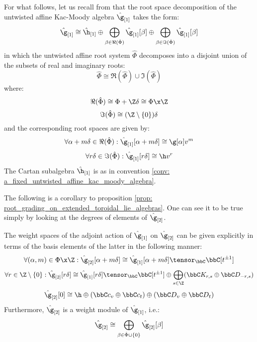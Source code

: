         \begin{remark}
            For what follows, let us recall from \cite[Chapter 7]{kac_infinite_dimensional_lie_algebras} that the root space decomposition of the untwisted affine Kac-Moody algebra $\hat{\g}_{[1]}$ takes the form:
                $$\hat{\g}_{[1]} \cong \hat{\h}_{[1]} \oplus \bigoplus_{\beta \in \Re(\hat{\Phi})} \hat{\g}_{[1]}[\beta] \oplus \bigoplus_{\beta \in \Im(\hat{\Phi})} \hat{\g}_{[1]}[\beta]$$
            in which the untwisted affine root system $\hat{\Phi}$ decomposes into a disjoint union of the subsets of real and imaginary roots:
                $$\hat{\Phi} \cong \Re(\hat{\Phi}) \cup \Im(\hat{\Phi})$$
            where:
                $$\Re(\hat{\Phi}) \cong \Phi + \Z\delta \cong \Phi \x \Z$$
                $$\Im(\hat{\Phi}) \cong (\Z \setminus \{0\})\delta$$
            and the corresponding root spaces are given by:
                $$\forall \alpha + m\delta \in \Re(\hat{\Phi}): \hat{\g}_{[1]}[\alpha + m\delta] \cong \g[\alpha] v^m$$
                $$\forall r\delta \in \Im(\hat{\Phi}): \hat{\g}_{[1]}[r\delta] \cong \h v^r$$
            The Cartan subalgebra $\hat{\h}_{[1]}$ is as in convention \ref{conv: a_fixed_untwisted_affine_kac_moody_algebra}.
        \end{remark}    
        The following is a corollary to proposition \ref{prop: root_grading_on_extended_toroidal_lie_algebras}. One can see it to be true simply by looking at the degrees of elements of $\hat{\g}_{[2]}$. 
        \begin{theorem} \label{theorem: root_space_decomposition_for_extended_toroidal_lie_algebras}
            The weight spaces of the adjoint action of $\hat{\g}_{[1]}$ on $\hat{\g}_{[2]}$ can be given explicitly in terms of the basis elements of the latter in the following manner:
                $$\forall (\alpha, m) \in \Phi \x \Z: \hat{\g}_{[2]}[\alpha + m\delta] \cong \hat{\g}_{[1]}[\alpha + m\delta] \tensor_{\bbC} \bbC[t^{\pm 1}]$$
                $$
                    \forall r \in \Z \setminus \{0\}: \hat{\g}_{[2]}[r \delta] \cong \hat{\g}_{[1]}[r \delta] \tensor_{\bbC} \bbC[t^{\pm 1}] \oplus \bigoplus_{s \in \Z} (\bbC K_{r, s} \oplus \bbC D_{-r, s})
                $$
                $$\hat{\g}_{[2]}[0] \cong \h \oplus (\bbC c_v \oplus \bbC c_t) \oplus (\bbC D_v \oplus \bbC D_t)$$
            Furthermore, $\hat{\g}_{[2]}$ is a weight module of $\hat{\g}_{[1]}$, i.e.:
                $$\hat{\g}_{[2]} \cong \bigoplus_{\beta \in \hat{\Phi} \cup \{0\}} \hat{\g}_{[2]}[\beta]$$
        \end{theorem}
